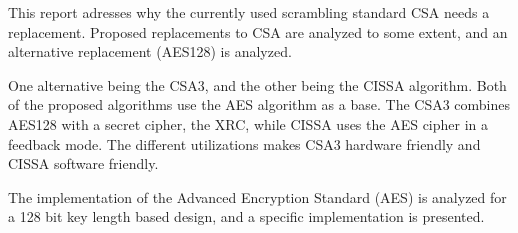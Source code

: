 This report adresses why the currently used scrambling standard CSA 
needs a replacement. Proposed replacements to CSA are analyzed to some 
extent, and an alternative replacement (AES128) is analyzed.

One alternative being the CSA3, and the other being the CISSA 
algorithm. Both of the proposed algorithms use the AES algorithm as a 
base. The CSA3 combines AES128 with a secret cipher, the XRC, while 
CISSA uses the AES cipher in a feedback mode. The different 
utilizations makes CSA3 hardware friendly and CISSA software friendly.

The implementation of the Advanced Encryption Standard (AES) is 
analyzed for a 128 bit key length based design, and a specific 
implementation is presented.
